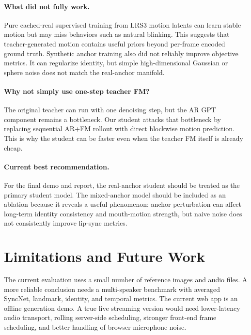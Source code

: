 \documentclass{article}
\begin{document}
\paragraph{What did not fully work.}
Pure cached-real supervised training from LRS3 motion latents can learn stable motion but may miss behaviors such as natural blinking. This suggests that teacher-generated motion contains useful priors beyond per-frame encoded ground truth. Synthetic anchor training also did not reliably improve objective metrics. It can regularize identity, but simple high-dimensional Gaussian or sphere noise does not match the real-anchor manifold.

\paragraph{Why not simply use one-step teacher FM?}
The original teacher can run with one denoising step, but the AR GPT component remains a bottleneck. Our student attacks that bottleneck by replacing sequential AR+FM rollout with direct blockwise motion prediction. This is why the student can be faster even when the teacher FM itself is already cheap.

\paragraph{Current best recommendation.}
For the final demo and report, the real-anchor student should be treated as the primary student model. The mixed-anchor model should be included as an ablation because it reveals a useful phenomenon: anchor perturbation can affect long-term identity consistency and mouth-motion strength, but naive noise does not consistently improve lip-sync metrics.

\section{Limitations and Future Work}

The current evaluation uses a small number of reference images and audio files. A more reliable conclusion needs a multi-speaker benchmark with averaged SyncNet, landmark, identity, and temporal metrics. The current web app is an offline generation demo. A true live streaming version would need lower-latency audio transport, rolling server-side scheduling, stronger front-end frame scheduling, and better handling of browser microphone noise.
\end{document}
